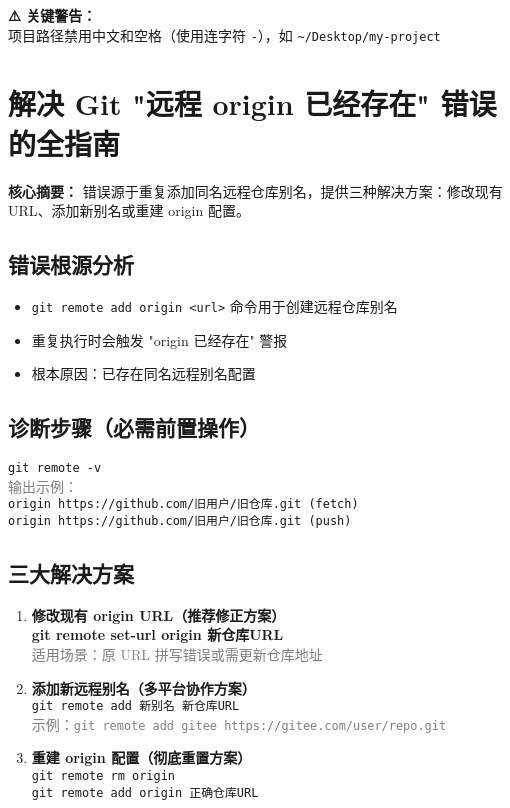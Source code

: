 \textbf{⚠️ 关键警告：} \\
项目路径禁用中文和空格（使用连字符 \texttt{-}），如 \texttt{\textasciitilde/Desktop/my{-}project}


\section{解决 Git "远程 origin 已经存在" 错误的全指南}
\textbf{核心摘要：}  
错误源于重复添加同名远程仓库别名，提供三种解决方案：修改现有 URL、添加新别名或重建 origin 配置。

\subsection{错误根源分析}
\begin{itemize}[leftmargin=*, nosep]
    \item \texttt{git remote add origin <url>} 命令用于创建远程仓库别名
    \item 重复执行时会触发 "origin 已经存在" 警报
    \item 根本原因：已存在同名远程别名配置
\end{itemize}

\subsection{诊断步骤（必需前置操作）}
\begin{center}
    \texttt{git remote -v} \\
    \textcolor{gray}{输出示例：} \\
    \texttt{origin https://github.com/旧用户/旧仓库.git (fetch)} \\
    \texttt{origin https://github.com/旧用户/旧仓库.git (push)}
\end{center}

\subsection{三大解决方案}
\begin{enumerate}[leftmargin=*, nosep]
    \item \textbf{修改现有 origin URL（推荐修正方案）} \\
   {\color{red}\textbf{git remote set-url origin 新仓库URL}}\\
    \textcolor{gray}{适用场景：原 URL 拼写错误或需更新仓库地址}
    
    \item \textbf{添加新远程别名（多平台协作方案）} \\
    \texttt{git remote add 新别名 新仓库URL} \\
    \textcolor{gray}{示例：\texttt{git remote add gitee https://gitee.com/user/repo.git}}
    
    \item \textbf{重建 origin 配置（彻底重置方案）} \\
    \texttt{git remote rm origin} \\
    \texttt{git remote add origin 正确仓库URL}
\end{enumerate}

